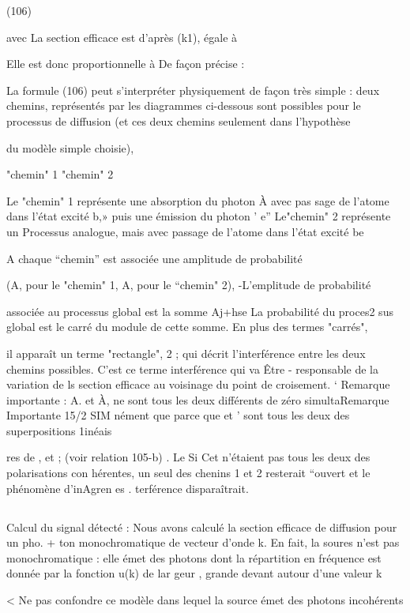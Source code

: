 (106)

avec
La section efficace est  d'après (k1), égale à

Elle est donc proportionnelle à De façon précise :

La formule (106) peut s'interpréter physiquement de façon très simple :
deux chemins, représentés par les diagrammes ci-dessous sont possibles pour
le processus de diffusion (et ces deux chemins seulement dans l'hypothèse

du modèle simple choisie),

"chemin" 1 "chemin" 2

Le "chemin" 1 représente une absorption du photon À  avec pas
sage de l'atome dans l'état excité b,» puis une émission du photon ' e”
Le"chemin" 2 représente un Processus analogue, mais avec passage de l'atome
dans l'état excité be

A chaque “chemin” est associée une amplitude de probabilité

(A, pour le "chemin" 1, A, pour le “chemin" 2), -L'emplitude de probabilité

associée au processus global est la somme Aj+hse La probabilité du proces2
sus global est le carré du module de cette somme. En plus des termes "carrés",

il apparaît un terme "rectangle", 2 ; qui décrit l'interférence
entre les deux chemins possibles. C'est ce terme interférence qui va Être
- responsable de la variation de ls section efficace au voisinage du point de
croisement. ‘
Remarque importante : A. et À, ne sont tous les deux différents de zéro simultaRemarque Importante 15/2 SIM
nément que parce que  et ’ sont tous les deux des superpositions 1inéais

res de , et ; (voir relation 105-b)
 . Le
Si Cet  n'étaient pas tous les deux des polarisations con
hérentes, un seul des chenins 1 et 2 resterait “ouvert et le phénomène d'inAgren es .
terférence disparaîtrait.
\subsection{} Calcul du signal détecté :%
Nous avons calculé la section efficace de diffusion pour un pho. +
ton monochromatique de vecteur d'onde k.
En fait, la soures n'est pas monochromatique : elle émet des photons dont la répartition en fréquence est donnée par la fonction u(k) de lar
geur , grande devant  autour d'une valeur k

< Ne pas confondre ce modèle dans lequel la source émet des photons incohérents

